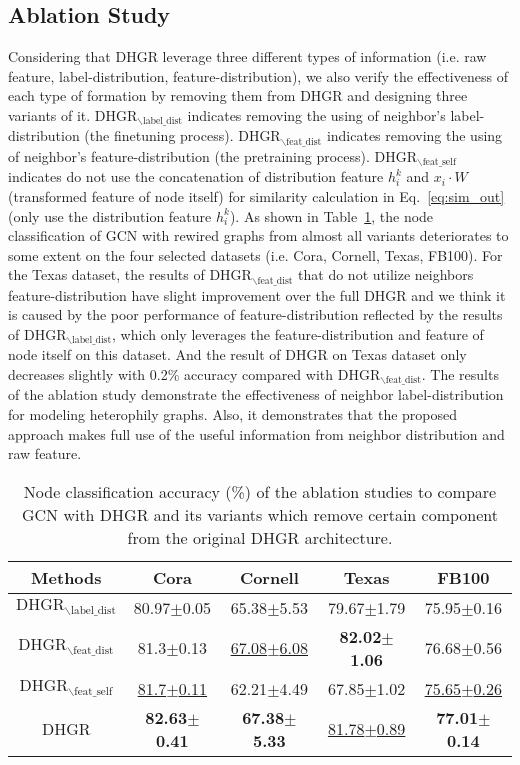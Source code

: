 \documentclass[sigconf]{acmart}
\begin{document}
	\subsection{Ablation Study}
	Considering that DHGR leverage three different types of information (i.e. raw feature, label-distribution, feature-distribution), we also verify the effectiveness of each type of formation by removing them from DHGR and designing three variants of it. $\text{DHGR}_{\backslash \text{label\_dist}}$ indicates removing the using of neighbor's label-distribution (the finetuning process). $\text{DHGR}_{\backslash \text{feat\_dist}}$ indicates removing the using of neighbor's feature-distribution (the pretraining process).
	$\text{DHGR}_{\backslash \text{feat\_self}}$ indicates do not use the concatenation of distribution feature $h_i^{k}$ and  $x_i\cdot W$ (transformed feature of node itself) for similarity calculation in Eq.~\ref{eq:sim_out} (only use the distribution feature $h_i^{k}$). As shown in Table~\ref{tab:ablation}, the node classification of GCN with rewired graphs from almost all variants deteriorates to some extent on the four selected datasets (i.e. Cora, Cornell, Texas, FB100). For the Texas dataset, the results of $\text{DHGR}_{\backslash \text{feat\_dist}}$  that do not utilize neighbors feature-distribution have slight improvement over the full DHGR and we think it is caused by the poor performance of feature-distribution reflected by the results of $\text{DHGR}_{\backslash \text{label\_dist}}$, which only leverages the feature-distribution and feature of node itself  on this dataset. And the result of DHGR on Texas dataset only decreases slightly with 0.2\% accuracy compared with $\text{DHGR}_{\backslash \text{feat\_dist}}$. The results of the ablation study demonstrate the effectiveness of neighbor label-distribution for modeling heterophily graphs. Also, it demonstrates that the proposed approach makes full use of the useful information from  neighbor distribution and raw feature.
	\begin{table}
		\small
		\centering
		\setlength{\tabcolsep}{3.0pt}
		\caption{Node classification accuracy (\%) of the ablation studies to compare GCN with DHGR and its variants which remove certain component from the original DHGR architecture.
		}
		\label{tab:ablation}
		\begin{tabular}{ccccc}
			\toprule
			Methods  & Cora & Cornell & Texas & FB100 \\
			\midrule
			$\text{DHGR}_{\backslash \text{label\_dist}}$ & 80.97$\pm$0.05 & {65.38$\pm$5.53} & {79.67$\pm$1.79}  & {75.95$\pm$0.16}  \\
			$\text{DHGR}_{\backslash \text{feat\_dist}}$ & 81.3$\pm$0.13  & \underline{67.08$\pm$6.08} & \textbf{82.02$\pm$1.06}  & {76.68$\pm$0.56}  \\
			$\text{DHGR}_{\backslash \text{feat\_self}}$ & \underline{81.7$\pm$0.11 }& 62.21$\pm$4.49 & 67.85$\pm$1.02 & \underline{75.65$\pm$0.26}  \\
			DHGR & \textbf{82.63$\pm$0.41}  & \textbf{67.38$\pm$5.33} & \underline{81.78$\pm$0.89}   & \textbf{77.01$\pm$0.14}  \\
			\bottomrule
		\end{tabular}
	\end{table}
\end{document}
